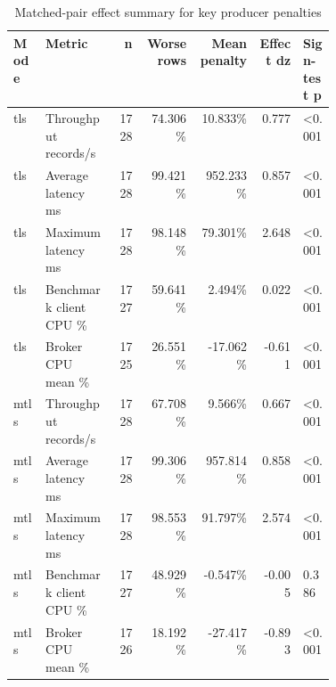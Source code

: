 \begin{table}[H]
\centering
\setlength{\tabcolsep}{4pt}
\renewcommand{\arraystretch}{1.15}
\begin{tabular}{|p{0.10\linewidth}|p{0.22\linewidth}|r|r|r|r|p{0.10\linewidth}|}
\hline
\textbf{Mode} & \textbf{Metric} & \textbf{n} & \textbf{Worse rows} & \textbf{Mean penalty} & \textbf{Effect dz} & \textbf{Sign-test p} \\
\hline
tls & Throughput records/s & 1728 & 74.306\% & 10.833\% & 0.777 & <0.001 \\
tls & Average latency ms & 1728 & 99.421\% & 952.233\% & 0.857 & <0.001 \\
tls & Maximum latency ms & 1728 & 98.148\% & 79.301\% & 2.648 & <0.001 \\
tls & Benchmark client CPU \% & 1727 & 59.641\% & 2.494\% & 0.022 & <0.001 \\
tls & Broker CPU mean \% & 1725 & 26.551\% & -17.062\% & -0.611 & <0.001 \\
mtls & Throughput records/s & 1728 & 67.708\% & 9.566\% & 0.667 & <0.001 \\
mtls & Average latency ms & 1728 & 99.306\% & 957.814\% & 0.858 & <0.001 \\
mtls & Maximum latency ms & 1728 & 98.553\% & 91.797\% & 2.574 & <0.001 \\
mtls & Benchmark client CPU \% & 1727 & 48.929\% & -0.547\% & -0.005 & 0.386 \\
mtls & Broker CPU mean \% & 1726 & 18.192\% & -27.417\% & -0.893 & <0.001 \\
\hline
\end{tabular}
\caption{Matched-pair effect summary for key producer penalties}
\label{tab:producer-paired-effects}
\end{table}
